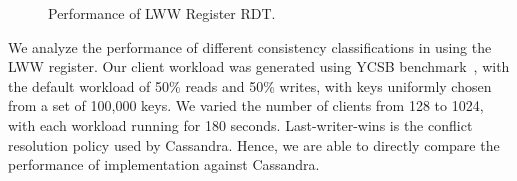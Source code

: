 \begin{figure}
  \centering
	\caption{Performance of LWW Register RDT.}
  \label{grf:LWW_perf}
\end{figure}

We analyze the performance of different consistency classifications in \name
using the LWW register. Our client workload was generated using YCSB
benchmark~\cite{}, with the default workload of 50\% reads and 50\% writes,
with keys uniformly chosen from a set of 100,000 keys. We varied the number of
clients from 128 to 1024, with each workload running for 180 seconds.
Last-writer-wins is the conflict resolution policy used by Cassandra. Hence, we
are able to directly compare the performance of \name implementation against
Cassandra.

